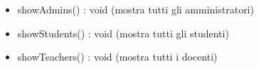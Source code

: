 \begin{description}
\begin{itemize}
\item showAdmins() : void (mostra tutti gli amministratori)
\item showStudents() : void (mostra tutti gli studenti)
\item showTeachers() : void (mostra tutti i docenti)
\end{itemize}

\end{description}

\vspace{0.5cm}
